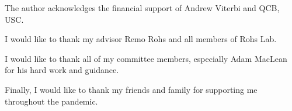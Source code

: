 The author acknowledges the financial support of Andrew Viterbi and QCB, USC.

I would like to thank my advisor Remo Rohs and all members of Rohs Lab.

I would like to thank all of my committee members, especially Adam MacLean for his hard work and guidance. 

Finally, I would like to thank my friends and family for supporting me throughout the pandemic.
